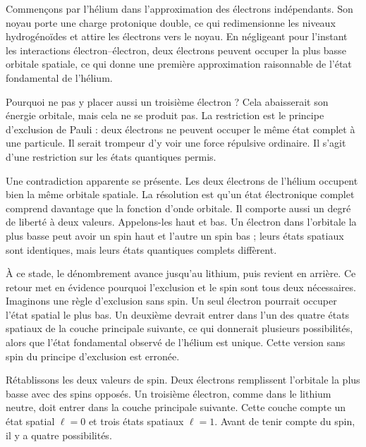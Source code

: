 Commençons par l’hélium dans l’approximation des électrons indépendants. Son noyau porte une charge protonique double, ce qui redimensionne les niveaux hydrogénoïdes et attire les électrons vers le noyau. En négligeant pour l’instant les interactions électron--électron, deux électrons peuvent occuper la plus basse orbitale spatiale, ce qui donne une première approximation raisonnable de l’état fondamental de l’hélium.

Pourquoi ne pas y placer aussi un troisième électron ? Cela abaisserait son énergie orbitale, mais cela ne se produit pas. La restriction est le principe d’exclusion de Pauli : deux électrons ne peuvent occuper le même état complet à une particule. Il serait trompeur d’y voir une force répulsive ordinaire. Il s’agit d’une restriction sur les états quantiques permis.

Une contradiction apparente se présente. Les deux électrons de l’hélium occupent bien la même orbitale spatiale. La résolution est qu’un état électronique complet comprend davantage que la fonction d’onde orbitale. Il comporte aussi un degré de liberté à deux valeurs. Appelons-les haut et bas. Un électron dans l’orbitale la plus basse peut avoir un spin haut et l’autre un spin bas ; leurs états spatiaux sont identiques, mais leurs états quantiques complets diffèrent.

À ce stade, le dénombrement avance jusqu’au lithium, puis revient en arrière. Ce retour met en évidence pourquoi l’exclusion et le spin sont tous deux nécessaires. Imaginons une règle d’exclusion sans spin. Un seul électron pourrait occuper l’état spatial le plus bas. Un deuxième devrait entrer dans l’un des quatre états spatiaux de la couche principale suivante, ce qui donnerait plusieurs possibilités, alors que l’état fondamental observé de l’hélium est unique. Cette version sans spin du principe d’exclusion est erronée.

Rétablissons les deux valeurs de spin. Deux électrons remplissent l’orbitale la plus basse avec des spins opposés. Un troisième électron, comme dans le lithium neutre, doit entrer dans la couche principale suivante. Cette couche compte un état spatial \(\ell=0\) et trois états spatiaux \(\ell=1\). Avant de tenir compte du spin, il y a quatre possibilités.

\begin{classroomqa}
\end{classroomqa}

